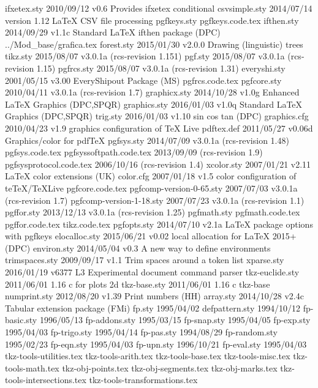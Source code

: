  ifxetex.sty    2010/09/12 v0.6 Provides ifxetex conditional
csvsimple.sty    2014/07/14 version 1.12 LaTeX CSV file processing
 pgfkeys.sty    
 pgfkeys.code.tex
  ifthen.sty    2014/09/29 v1.1c Standard LaTeX ifthen package (DPC)
../Mod_base/grafica.tex
  forest.sty    2015/01/30 v2.0.0 Drawing (linguistic) trees
    tikz.sty    2015/08/07 v3.0.1a (rcs-revision 1.151)
     pgf.sty    2015/08/07 v3.0.1a (rcs-revision 1.15)
  pgfrcs.sty    2015/08/07 v3.0.1a (rcs-revision 1.31)
everyshi.sty    2001/05/15 v3.00 EveryShipout Package (MS)
  pgfrcs.code.tex
 pgfcore.sty    2010/04/11 v3.0.1a (rcs-revision 1.7)
graphicx.sty    2014/10/28 v1.0g Enhanced LaTeX Graphics (DPC,SPQR)
graphics.sty    2016/01/03 v1.0q Standard LaTeX Graphics (DPC,SPQR)
    trig.sty    2016/01/03 v1.10 sin cos tan (DPC)
graphics.cfg    2010/04/23 v1.9 graphics configuration of TeX Live
  pdftex.def    2011/05/27 v0.06d Graphics/color for pdfTeX
  pgfsys.sty    2014/07/09 v3.0.1a (rcs-revision 1.48)
  pgfsys.code.tex
pgfsyssoftpath.code.tex    2013/09/09  (rcs-revision 1.9)
pgfsysprotocol.code.tex    2006/10/16  (rcs-revision 1.4)
  xcolor.sty    2007/01/21 v2.11 LaTeX color extensions (UK)
   color.cfg    2007/01/18 v1.5 color configuration of teTeX/TeXLive
 pgfcore.code.tex
pgfcomp-version-0-65.sty    2007/07/03 v3.0.1a (rcs-revision 1.7)
pgfcomp-version-1-18.sty    2007/07/23 v3.0.1a (rcs-revision 1.1)
  pgffor.sty    2013/12/13 v3.0.1a (rcs-revision 1.25)
 pgfmath.sty    
 pgfmath.code.tex
  pgffor.code.tex
    tikz.code.tex
 pgfopts.sty    2014/07/10 v2.1a LaTeX package options with pgfkeys
elocalloc.sty    2015/06/21 v0.02 local allocation for LaTeX 2015+ (DPC)
 environ.sty    2014/05/04 v0.3 A new way to define environments
trimspaces.sty    2009/09/17 v1.1 Trim spaces around a token list
  xparse.sty    2016/01/19 v6377 L3 Experimental document command parser
tkz-euclide.sty    2011/06/01 1.16 c for plots 2d 
tkz-base.sty    2011/06/01 1.16 c tkz-base
numprint.sty    2012/08/20 v1.39 Print numbers (HH)
   array.sty    2014/10/28 v2.4c Tabular extension package (FMi)
      fp.sty    1995/04/02
defpattern.sty    1994/10/12
fp-basic.sty    1996/05/13
fp-addons.sty    1995/03/15
 fp-snap.sty    1995/04/05
  fp-exp.sty    1995/04/03
fp-trigo.sty    1995/04/14
  fp-pas.sty    1994/08/29
fp-random.sty    1995/02/23
  fp-eqn.sty    1995/04/03
  fp-upn.sty    1996/10/21
 fp-eval.sty    1995/04/03
tkz-tools-utilities.tex
tkz-tools-arith.tex
tkz-tools-base.tex
tkz-tools-misc.tex
tkz-tools-math.tex
tkz-obj-points.tex
tkz-obj-segments.tex
tkz-obj-marks.tex
tkz-tools-intersections.tex
tkz-tools-transformations.tex
